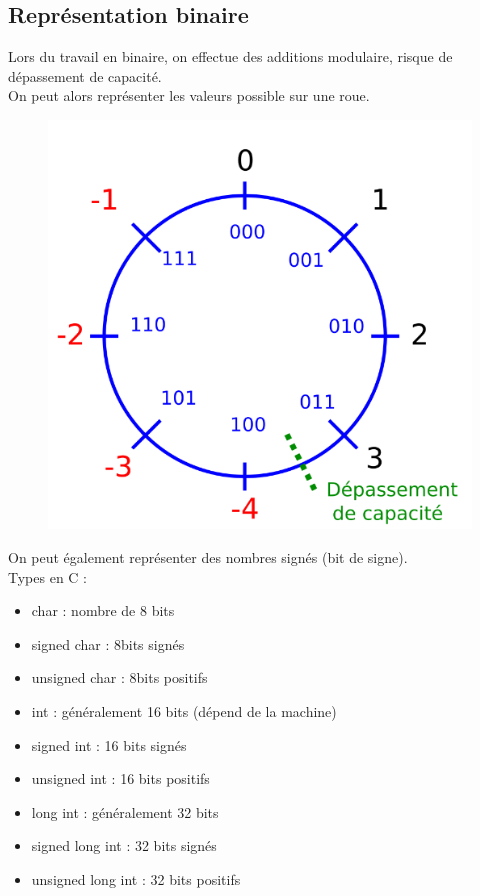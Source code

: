 \documentclass[../main.tex]{subfiles}
\begin{document}
\localtableofcontents

\subsection{Représentation binaire}
\warning Lors du travail en binaire, on effectue des additions modulaire, risque de dépassement de capacité.\\

On peut alors représenter les valeurs possible sur une roue.\\

\begin{figure}[hbt!]
    \centering
    \includegraphics[width=.5\textwidth]{IMAGES/elec/Screenshot from 2024-02-29 11-40-53.png}
\end{figure}

On peut également représenter des nombres signés (bit de signe).\\

Types en C : \begin{itemize}
    \item char : nombre de 8 bits\\
    \item signed char : 8bits signés\\
    \item unsigned char : 8bits positifs\\
    \item int : généralement 16 bits (dépend de la machine)\\
    \item signed int : 16 bits signés\\
    \item unsigned int : 16 bits positifs\\
    \item long int : généralement 32 bits\\
    \item signed long int : 32 bits signés\\
    \item unsigned long int : 32 bits positifs\\
\end{itemize}
\end{document}
